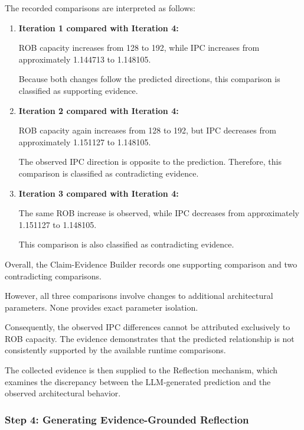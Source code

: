 The recorded comparisons are interpreted
as follows:

\begin{enumerate}

\item \textbf{Iteration 1 compared with Iteration 4:}

ROB capacity increases from 128 to 192,
while IPC increases from approximately
1.144713 to 1.148105.

Because both changes follow the predicted
directions, this comparison is classified
as supporting evidence.

\item \textbf{Iteration 2 compared with Iteration 4:}

ROB capacity again increases from 128 to
192, but IPC decreases from approximately
1.151127 to 1.148105.

The observed IPC direction is opposite
to the prediction. Therefore, this
comparison is classified as contradicting
evidence.

\item \textbf{Iteration 3 compared with Iteration 4:}

The same ROB increase is observed, while
IPC decreases from approximately 1.151127
to 1.148105.

This comparison is also classified as
contradicting evidence.

\end{enumerate}

Overall, the Claim-Evidence Builder records
one supporting comparison and two
contradicting comparisons.

However, all three comparisons involve
changes to additional architectural
parameters. None provides exact
parameter isolation.

Consequently, the observed IPC differences
cannot be attributed exclusively to ROB
capacity. The evidence demonstrates that
the predicted relationship is not
consistently supported by the available
runtime comparisons.

The collected evidence is then supplied
to the Reflection mechanism, which
examines the discrepancy between the
LLM-generated prediction and the
observed architectural behavior.



\subsubsection{Step 4: Generating Evidence-Grounded Reflection}

